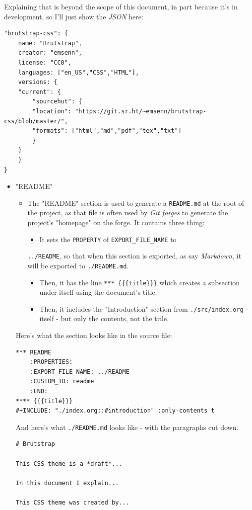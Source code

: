 \documentclass[11pt]{article}
\begin{document}
Explaining that is beyond the scope of this document, in part because
it's in development, so I'll just show the \emph{JSON} here:
\begin{verbatim}
"brutstrap-css": {
    name: "Brutstrap",
    creator: "emsenn",
    license: "CC0",
    languages: ["en_US","CSS","HTML"],
    versions: {
	"current": {
	    "sourcehut": {
		"location": "https://git.sr.ht/~emsenn/brutstrap-css/blob/master/",
		"formats": ["html","md","pdf","tex","txt"]
	    }
	}
    }
}
\end{verbatim}
\begin{itemize}
\item "README"
\begin{itemize}
\item The "README" section is used to generate a \texttt{README.md} at the root
of the project, as that file is often used by \emph{Git forges} to
generate the project's "homepage" on the forge. It contains three
thing:
\begin{itemize}
\item It sets the \texttt{PROPERTY} of \texttt{EXPORT\_FILE\_NAME} to
\end{itemize}
\texttt{../README}, so that when this section is exported, as say
\emph{Markdown}, it will be exported to \texttt{./README.md}.
\begin{itemize}
\item Then, it has the line \texttt{*** \{\{\{title\}\}\}} which creates a
subsection under itself using the document's title.
\item Then, it includes the "Introduction" section from
\texttt{./src/index.org} - itself - but only the contents, not the
title.
\end{itemize}
\end{itemize}
Here's what the section looks like in the source file:
\begin{verbatim}
*** README
    :PROPERTIES:
    :EXPORT_FILE_NAME: ../README
    :CUSTOM_ID: readme
    :END:
**** {{{title}}}
#+INCLUDE: "./index.org::#introduction" :only-contents t
\end{verbatim}

And here's what \texttt{./README.md} looks like - with the paragraphs cut
down.
\begin{verbatim}
# Brutstrap

This CSS theme is a *draft*...

In this document I explain...

This CSS theme was created by...
\end{verbatim}
\end{itemize}
\end{document}
